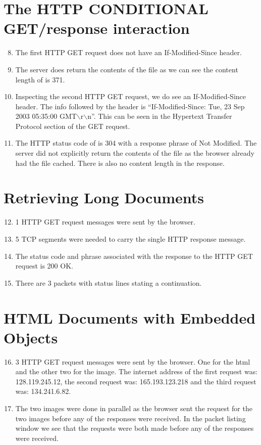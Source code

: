 \documentclass{article}
\begin{document}
\section{The HTTP CONDITIONAL GET/response interaction}
\begin{enumerate}
    \setcounter{enumi}{7}
    \item The first HTTP GET request does not have an If-Modified-Since header. 
    \item The server does return the contents of the file as we can see the content length of is 371.
    \item Inspecting the second HTTP GET request, we do see an If-Modified-Since header. The info followed by the header is ``If-Modified-Since: Tue, 23 Sep 2003 05:35:00 GMT$\backslash$r$\backslash$n''. This can be seen in the Hypertext Transfer Protocol section of the GET request.
    \item The HTTP status code of is 304 with a response phrase of Not Modified. The server did not explicitly return the contents of the file as the browser already had the file cached. There is also no content length in the response.
\end{enumerate}

\section{Retrieving Long Documents}
\begin{enumerate}
    \setcounter{enumi}{11}
    \item 1 HTTP GET request messages were sent by the browser. 
    \item 5 TCP segments were needed to carry the single HTTP response message.
    \item The status code and phrase associated with the response to the HTTP GET request is 200 OK.
    \item There are 3 packets with status lines stating a continuation. 
\end{enumerate}

\section{HTML Documents with Embedded Objects}

\begin{enumerate}
    \setcounter{enumi}{15}
    \item 3 HTTP GET request messages were sent by the browser. One for the html and the other two for the image. The internet address of the first request was: 128.119.245.12, the second request was: 165.193.123.218 and the third request was: 134.241.6.82.
    \item The two images were done in parallel as the browser sent the request for the two images before any of the responses were received. In the packet listing window we see that the requests were both made before any of the responses were received.
\end{enumerate}
\end{document}
